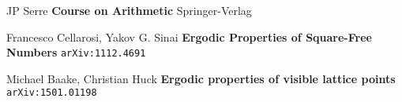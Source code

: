 \documentclass[12pt]{article}
\begin{document}
\newpage


\newpage

\selectfont \fontsize{12}{10}\selectfont

\begin{thebibliography}{}

\item JP Serre \textbf{Course on Arithmetic} Springer-Verlag
\item Francesco Cellarosi, Yakov G. Sinai \textbf{Ergodic Properties of Square-Free Numbers} \texttt{arXiv:1112.4691}
\item Michael Baake, Christian Huck \textbf{Ergodic properties of visible lattice points} \texttt{arXiv:1501.01198}



\end{thebibliography}
\end{document}
